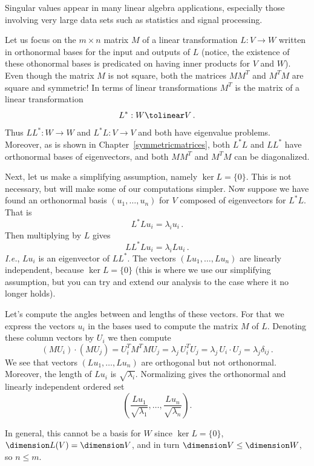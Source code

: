 Singular values appear in many linear algebra applications, especially those involving very large data sets such as statistics and signal processing. 

Let us focus on the $m\times n$ matrix $M$ of a linear transformation $L:V\to W$ written in orthonormal bases for the input and outputs of $L$ (notice, the existence of these othonormal bases is predicated on having inner products for $V$ and $W$).
Even though the matrix $M$ is not square, both the matrices $M M^T$ and $M^T M$ are square and symmetric! 
In terms of linear transformations $M^T$ is the matrix of a linear transformation 
\[
L^*:W\tolinear V\, .
\]
Thus $LL^*:W\to W$ and $L^*L:V\to V$ and both have eigenvalue problems.
Moreover,  as is shown  in Chapter~\ref{symmetricmatrices},  both $L^*L$ and $LL^*$ have orthonormal bases of eigenvectors, and
 both $MM^T$ and $M^TM$ can be diagonalized. 
 
Next, let us make a simplifying assumption, namely $\ker L=\{0\}$. This is not necessary, but will make some of our computations simpler.
Now suppose we have found an orthonormal basis $(u_1,\ldots , u_n)$ for $V$ composed of eigenvectors for $L^*L$. That is 
\[
L^*L u_i= \lambda_i u_i\, .
\]
Then multiplying by $L$ gives 
\[
L L^* L u_i = \lambda_i L u_i\, .
\]
{\itshape I.e.}, $L u_i$ is an eigenvector of $L L^*$.
The vectors $(Lu_1,\ldots, Lu_n)$ are linearly independent, because $\ker L=\{0\}$ (this is where we use our simplifying assumption, but you can 
try and extend our analysis to the case where it no longer holds). 

Let's compute the angles between and lengths of these vectors. 
For that we express the vectors $u_i$ in the bases used to compute the matrix $M$ of $L$. Denoting these column vectors by $U_i$ we then compute
\[
(MU_i)\cdot (MU_j)=U_i^T M^T M U_j = \lambda_j \, U_i^T U_j=\lambda_j \, U_i\cdot U_j = \lambda_j \delta_{ij}\, .
\]
We see that  vectors $(Lu_1,\ldots, Lu_n)$ are orthogonal but not orthonormal. Moreover, the length of $Lu_i$ is $\sqrt{\lambda_i}$.
Normalizing gives the orthonormal and linearly independent ordered set
\[
\left(\frac{Lu_1}{\sqrt{\lambda_1}},\ldots,\frac{Lu_n}{\sqrt{\lambda_n}}\right).
\]

In general, this cannot be a basis for $W$ 
since $\ker L=\{0\}$, $\dimension L(V)=\dimension V$,
and in turn $\dimension V\leq \dimension W$, so $n\leq m$. 

